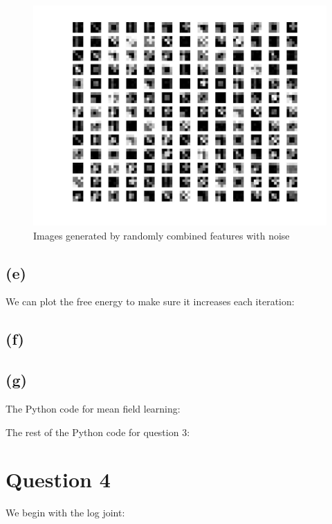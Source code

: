 \documentclass[12pt]{article}
\begin{document}
\begin{figure}[h]
\centering
\includegraphics[scale=0.4]{data/images}
\caption{Images generated by randomly combined features with noise}
\label{fig:3d-images}
\end{figure}

\subsection*{(e)}

We can plot the free energy to make sure it increases each iteration:

\subsection*{(f)}

\subsection*{(g)}




\newpage
The Python code for mean field learning:


\newpage
The rest of the Python code for question 3:

\newpage
\section*{Question 4}

We begin with the log joint:
\end{document}
